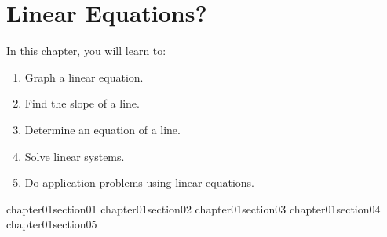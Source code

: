 \chapter{Linear Equations?} %

In this chapter, you will learn to:

\begin{enumerate}
    \item Graph a linear equation.
    \item Find the slope of a line.
    \item Determine an equation of a line.
    \item Solve linear systems.
    \item Do application problems using linear equations.
\end{enumerate}


{chapter01section01}
{chapter01section02}
{chapter01section03}
{chapter01section04}
{chapter01section05}